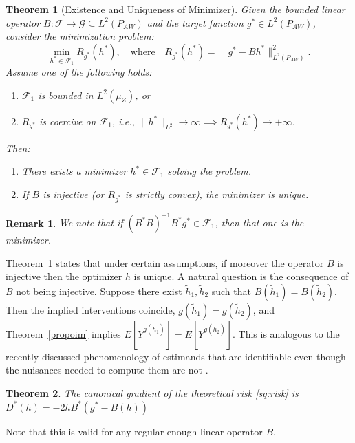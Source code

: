 \documentclass[12pt]{article}
\theoremstyle{thmstyleone}%
\newtheorem{theo}{Theorem}%
\theoremstyle{thmstyletwo}%
\newtheorem{rem}{Remark}%
\theoremstyle{thmstylethree}%
\begin{document}
\begin{theo}[Existence and Uniqueness of Minimizer]\label{eu}
	Given the bounded linear operator $B \colon \mathcal{F} \to \mathcal{G} \subseteq L^2(P_{AW})$ and the target function $g^* \in L^2(P_{AW}) $, consider the minimization problem:
	\[
	\min_{h^* \in \mathcal{F}_1} R_{g^*}(h^*), \quad \text{where} \quad R_{g^*}(h^*) = \|g^* - B h^*\|_{L^2(P_{AW})}^2.
	\]
	Assume one of the following holds:
	\begin{enumerate}
		\item $\mathcal{F}_1$ is bounded in $L^2(\mu_Z)$, or
		\item $R_{g^*}$ is coercive on $\mathcal{F}_1$, i.e., $\|h^*\|_{L^2} \to \infty \implies R_{g^*}(h^*) \to +\infty$.
	\end{enumerate}
	Then:
	\begin{enumerate}
		\item[(i)] There exists a minimizer $h^* \in \mathcal{F}_1$ solving the problem.
		\item[(ii)] If $B$ is injective (or $R_{g^*}$ is strictly convex), the minimizer is unique.
		
	\end{enumerate}
\end{theo}



\begin{rem}We note that if $(B^*B)^{-1}B^*g^* \in \mathcal{F}_1$, then that one is the minimizer. 
\end{rem}

Theorem~\ref{eu} states that under certain assumptions, if moreover the operator $B$ is injective then the optimizer $h$ is unique. A natural question is the consequence of $B$ not being injective. Suppose there exist $\tilde h_1, \tilde h_2$ such that $B(\tilde h_1) = B(\tilde h_2)$. Then the implied interventions coincide, $g(\tilde h_1) = g(\tilde h_2)$, and Theorem~\ref{propoim} implies $E[Y^{g(\tilde h_1)}] = E[Y^{g(\tilde h_2)}]$. This is analogous to the recently discussed phenomenology of estimands that are identifiable even though the nuisances needed to compute them are not \citep{neweak}. 



\begin{theo}\label{inf}
	The canonical gradient of the theoretical risk \ref{sq:risk} is $D^*(h) = -2 hB^*(g^* - B(h))$
\end{theo}
Note that this is valid for any regular enough linear operator $B$. 
\end{document}
